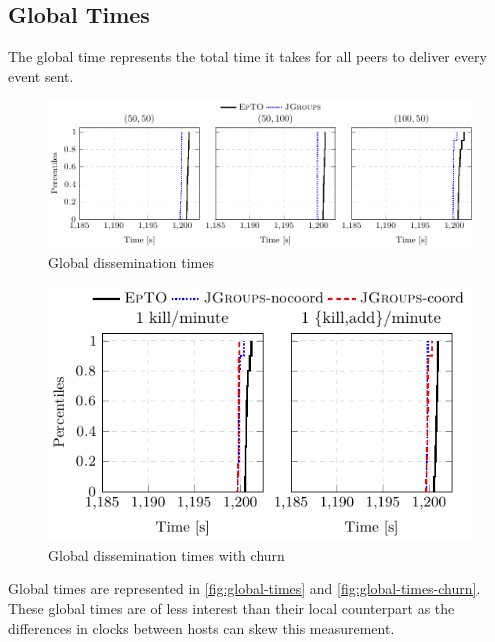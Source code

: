\subsection{Global Times}
The global time represents the total time it takes for all peers to deliver every event sent.
 \begin{figure}[hpt]
 	\centering
 	\includegraphics[width=\linewidth]{figures/global-times-nochurn.pdf}
 	\vspace{-2mm} 
 	\caption{Global dissemination times}
 	\vspace{-2mm}
 	\label{fig:global-times}  
 \end{figure}

 \begin{figure}[hpt]
 	\centering
 	\includegraphics[width=\linewidth]{figures/global-times-synth-churn.pdf}
 	\vspace{-2mm} 
 	\caption{Global dissemination times with churn}
 	\vspace{-2mm} 
 	\label{fig:global-times-churn} 
 \end{figure}
Global times are represented in \autoref{fig:global-times} and \autoref{fig:global-times-churn}. These global times are of less interest than their local counterpart as the differences in clocks between hosts can skew this measurement.


